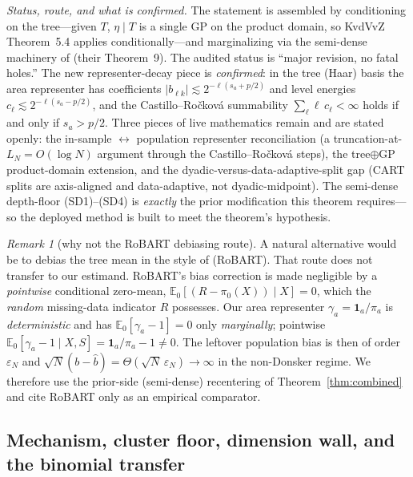 \documentclass[11pt]{article}
\theoremstyle{remark}
\newtheorem{remark}{Remark}
\newcommand{\E}{\mathbb{E}}
\begin{document}
\noindent\emph{Status, route, and what is confirmed.} The statement is assembled
by conditioning on the tree---given $T$, $\eta\mid T$ is a single GP on the
product domain, so KvdVvZ Theorem~5.4 applies conditionally---and marginalizing
via the semi-dense machinery of \citet{castillo2021cart} (their Theorem~9). The
audited status is ``major revision, no fatal holes.'' The new representer-decay
piece is \emph{confirmed}: in the tree (Haar) basis the area representer has
coefficients $|b_{\ell k}|\lesssim 2^{-\ell(s_a+p/2)}$ and level energies $c_\ell
\lesssim 2^{-\ell(s_a-p/2)}$, and the Castillo--Ro\v{c}kov\'a summability
$\sum_\ell \ell\, c_\ell < \infty$ holds if and only if $\boxed{s_a > p/2}$. Three
pieces of live mathematics remain and are stated openly: the in-sample
$\leftrightarrow$ population representer reconciliation (a truncation-at-$L_N=
O(\log N)$ argument through the Castillo--Ro\v{c}kov\'a steps), the tree$\oplus$GP
product-domain extension, and the dyadic-versus-data-adaptive-split gap (CART
splits are axis-aligned and data-adaptive, not dyadic-midpoint). The semi-dense
depth-floor (SD1)--(SD4) is \emph{exactly} the prior modification this theorem
requires---so the deployed method is built to meet the theorem's hypothesis.

\begin{remark}[why not the RoBART debiasing route]\label{rem:robart}
A natural alternative would be to debias the tree mean in the style of
\citet{breunig2025robart} (RoBART). That route does not transfer to our estimand.
RoBART's bias correction is made negligible by a \emph{pointwise} conditional
zero-mean, $\E_0[(R-\pi_0(X))\mid X]=0$, which the \emph{random} missing-data
indicator $R$ possesses. Our area representer $\gamma_a=\mathbf 1_a/\pi_a$ is
\emph{deterministic} and has $\E_0[\gamma_a-1]=0$ only \emph{marginally}; pointwise
$\E_0[\gamma_a-1\mid X,S]=\mathbf 1_a/\pi_a-1\neq 0$. The leftover population bias
is then of order $\varepsilon_N$ and $\sqrt N(b-\hat b)=\Theta(\sqrt
N\,\varepsilon_N)\to\infty$ in the non-Donsker regime. We therefore use the
prior-side (semi-dense) recentering of Theorem~\ref{thm:combined} and cite RoBART
only as an empirical comparator.
\end{remark}

\subsection{Mechanism, cluster floor, dimension wall, and the binomial transfer}
\end{document}
